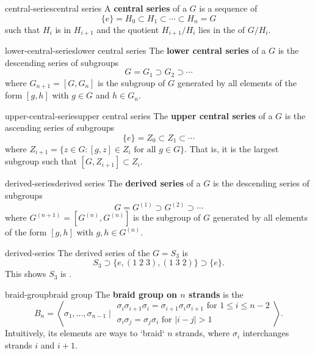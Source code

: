 \begin{topic}{central-series}{central series}
    A \textbf{central series} of a  $G$ is a sequence of 
    \[ \{ e \} = H_0 \subset H_1 \subset \cdots \subset H_n = G \]
    such that $H_i$ is  in $H_{i + 1}$ and the quotient $H_{i + 1}/H_i$ lies in the  of $G/H_i$.
\end{topic}

\begin{topic}{lower-central-series}{lower central series}
    The \textbf{lower central series} of a  $G$ is the descending series of subgroups
    \[ G = G_1 \supset G_2 \supset \cdots \]
    where $G_{n + 1} = [G, G_n]$ is the subgroup of $G$ generated by all elements of the form $[g, h]$ with $g \in G$ and $h \in G_n$.
\end{topic}

\begin{topic}{upper-central-series}{upper central series}
    The \textbf{upper central series} of a  $G$ is the ascending series of subgroups
    \[ \{ e \} = Z_0 \subset Z_1 \subset \cdots \]
    where $Z_{i + 1} = \{ z \in G : [g, z] \in Z_i \text{ for all } g \in G \}$. That is, it is the largest subgroup such that $[G, Z_{i + 1}] \subset Z_i$.
\end{topic}

\begin{topic}{derived-series}{derived series}
    The \textbf{derived series} of a  $G$ is the descending series of subgroups
    \[ G = G^{(1)} \supset G^{(2)} \supset \cdots \]
    where $G^{(n + 1)} = [G^{(n)}, G^{(n)}]$ is the subgroup of $G$ generated by all elements of the form $[g, h]$ with $g, h \in G^{(n)}$.
\end{topic}

\begin{example}{derived-series}
    The derived series of the  $G = S_3$ is
    \[ S_3 \supset \{ e, (1 \; 2 \; 3), (1 \; 3 \; 2) \} \supset \{ e \} . \]
    This shows $S_3$ is .
\end{example}

\begin{topic}{braid-group}{braid group}
    The \textbf{braid group on $n$ strands} is the 
    \[ B_n = \left\langle \sigma_1, \ldots, \sigma_{n - 1} \;\bigg|\; \begin{array}{cc} \sigma_i \sigma_{i + 1} \sigma_i = \sigma_{i + 1} \sigma_i \sigma_{i + 1} \text{ for } 1 \le i \le n - 2 \\ \sigma_i \sigma_j = \sigma_j \sigma_i \text{ for } |i - j| > 1 \end{array} \right\rangle . \]
    Intuitively, its elements are ways to `braid` $n$ strands, where $\sigma_i$ interchanges strands $i$ and $i + 1$.
\end{topic}

